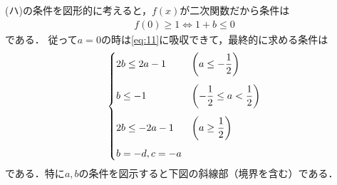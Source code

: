 \documentclass[../../main.tex]{subfiles}
\begin{document}
(ハ)の条件を図形的に考えると，$f(x)$が二次関数だから条件は
\begin{align}
  f(0) \ge 1 \iff 1+b \le 0 \label{eq:12}
\end{align}
である．
従って$a=0$の時は\cref{eq:11}に吸収できて，最終的に求める条件は
\begin{align}
  \begin{dcases}
    2b \le 2a-1 & \left(a \le -\dfrac{1}{2}\right) \\[4pt]
    b  \le -1     & \left(-\dfrac{1}{2} \le a < \dfrac{1}{2}\right) \\[4pt]
    2b \le -2a-1  & \left(a \ge \dfrac{1}{2}\right) \\[4pt]
    b = -d, c = -a &
  \end{dcases} \label{eq:13}
\end{align}
である．特に$a,b$の条件を図示すると下図の斜線部（境界を含む）である．
\end{document}
